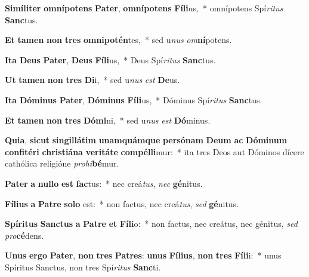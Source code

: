 \item \textbf{Si}\textbf{mí}\textbf{li}\textbf{ter} \textbf{om}\textbf{ní}\textbf{pot}\textbf{ens} \textbf{Pa}\textbf{ter}, \textbf{om}\textbf{ní}\textbf{pot}\textbf{ens} \textbf{Fí}\textbf{li}us,~* omnípotens Spí\textit{ri}\textit{tus} \textbf{Sanc}tus.
\item \textbf{Et} \textbf{ta}\textbf{men} \textbf{non} \textbf{tres} \textbf{om}\textbf{ni}\textbf{pot}\textbf{én}tes,~* sed u\textit{nus} \textit{om}\textbf{ní}potens.
\item \textbf{I}\textbf{ta} \textbf{De}\textbf{us} \textbf{Pa}\textbf{ter}, \textbf{De}\textbf{us} \textbf{Fí}\textbf{li}us,~* Deus Spí\textit{ri}\textit{tus} \textbf{Sanc}tus.
\item \textbf{Ut} \textbf{ta}\textbf{men} \textbf{non} \textbf{tres} \textbf{Di}i,~* sed u\textit{nus} \textit{est} \textbf{De}us.
\item \textbf{I}\textbf{ta} \textbf{Dó}\textbf{mi}\textbf{nus} \textbf{Pa}\textbf{ter}, \textbf{Dó}\textbf{mi}\textbf{nus} \textbf{Fí}\textbf{li}us,~* Dóminus Spí\textit{ri}\textit{tus} \textbf{Sanc}tus.
\item \textbf{Et} \textbf{ta}\textbf{men} \textbf{non} \textbf{tres} \textbf{Dó}\textbf{mi}ni,~* sed u\textit{nus} \textit{est} \textbf{Dó}minus.
\item \textbf{Qui}\textbf{a}, \textbf{sic}\textbf{ut} \textbf{sin}\textbf{gil}\textbf{lá}\textbf{tim} \textbf{u}\textbf{nam}\textbf{quám}\textbf{que} \textbf{per}\textbf{só}\textbf{nam} \textbf{De}\textbf{um} \textbf{ac} \textbf{Dó}\textbf{mi}\textbf{num} \textbf{con}\textbf{fi}\textbf{té}\textbf{ri} \textbf{chris}\textbf{ti}\textbf{á}\textbf{na} \textbf{ve}\textbf{ri}\textbf{tá}\textbf{te} \textbf{com}\textbf{pél}\textbf{li}mur:~* ita tres Deos aut Dóminos dícere cathólica religióne \textit{pro}\textit{hi}\textbf{bé}mur.
\item \textbf{Pa}\textbf{ter} \textbf{a} \textbf{nul}\textbf{lo} \textbf{est} \textbf{fac}tus:~* nec creá\textit{tus}, \textit{nec} \textbf{gé}nitus.
\item \textbf{Fí}\textbf{li}\textbf{us} \textbf{a} \textbf{Pa}\textbf{tre} \textbf{so}\textbf{lo} est:~* non factus, nec creá\textit{tus}, \textit{sed} \textbf{gé}nitus.
\item \textbf{Spí}\textbf{ri}\textbf{tus} \textbf{Sanc}\textbf{tus} \textbf{a} \textbf{Pa}\textbf{tre} \textbf{et} \textbf{Fí}\textbf{li}o:~* non factus, nec creátus, nec génitus, \textit{sed} \textit{pro}\textbf{cé}dens.
\item \textbf{U}\textbf{nus} \textbf{er}\textbf{go} \textbf{Pa}\textbf{ter}, \textbf{non} \textbf{tres} \textbf{Pa}\textbf{tres}: \textbf{u}\textbf{nus} \textbf{Fí}\textbf{li}\textbf{us}, \textbf{non} \textbf{tres} \textbf{Fí}\textbf{li}i:~* unus Spíritus Sanctus, non tres Spí\textit{ri}\textit{tus} \textbf{Sanc}ti.

